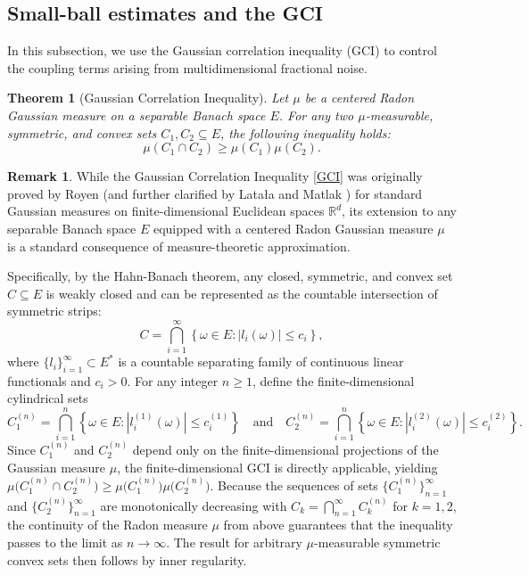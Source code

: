 \documentclass[preprint,12pt]{elsarticle}
\newtheorem{theorem}{Theorem}[section]
\theoremstyle{definition}
\newtheorem{remark}{Remark}[section]
\theoremstyle{plain}
\begin{document}
	


   
	        \subsection{Small-ball estimates and the GCI }
In this subsection, we use the Gaussian correlation inequality (GCI) to
control the coupling terms arising from multidimensional fractional noise.

\begin{theorem}[Gaussian Correlation Inequality]
Let $\mu$ be a centered Radon Gaussian measure on a separable Banach space $E$. For any two $\mu$-measurable, symmetric, and convex sets $C_1, C_2 \subseteq E$, the following inequality holds:
\begin{equation} \label{GCI}
\mu(C_1 \cap C_2) \geq \mu(C_1) \mu(C_2).
\end{equation}
\end{theorem}

\begin{remark}
While the Gaussian Correlation Inequality \eqref{GCI} was originally proved by Royen \cite{royen2014convex} (and further clarified by Lata{\l}a and Matlak \cite{latala2017royen}) for standard Gaussian measures on finite-dimensional Euclidean spaces $\mathbb{R}^d$, its extension to any separable Banach space $E$ equipped with a centered Radon Gaussian measure $\mu$ is a standard consequence of measure-theoretic approximation.

Specifically, by the  Hahn-Banach theorem, any closed, symmetric, and convex set $C \subseteq E$ is weakly closed and can be represented as the countable intersection of symmetric strips:
\[
    C = \bigcap_{i=1}^\infty \left\{ \omega \in E : |l_i(\omega)| \leq c_i \right\},
\]
where $\{l_i\}_{i=1}^\infty \subset E^*$ is a countable separating family of continuous linear functionals and $c_i > 0$. For any integer $n \geq 1$, define the finite-dimensional cylindrical sets
\[
    C^{(n)}_1 = \bigcap_{i=1}^n \left\{ \omega \in E : |l^{(1)}_i(\omega)| \leq c^{(1)}_i \right\} \quad \text{and} \quad C^{(n)}_2 = \bigcap_{i=1}^n \left\{ \omega \in E : |l^{(2)}_i(\omega)| \leq c^{(2)}_i \right\}.
\]
Since $C^{(n)}_1$ and $C^{(n)}_2$ depend only on the finite-dimensional projections of the Gaussian measure $\mu$, the finite-dimensional GCI is directly applicable, yielding $\mu\big(C^{(n)}_1 \cap C^{(n)}_2\big) \geq \mu\big(C^{(n)}_1\big) \mu\big(C^{(n)}_2\big)$.
Because the sequences of sets $\big\{C^{(n)}_1\big\}_{n=1}^\infty$ and $\big\{C^{(n)}_2\big\}_{n=1}^\infty$ are monotonically decreasing with $C_k = \bigcap_{n=1}^\infty C^{(n)}_k$ for $k=1,2$, the continuity of the Radon measure $\mu$ from above guarantees that the inequality passes to the limit as $n \to \infty$. The result for arbitrary $\mu$-measurable symmetric convex sets then follows by inner regularity.
\end{remark}
\end{document}
